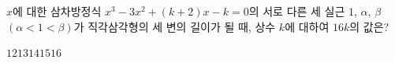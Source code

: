 $x$에 대한 삼차방정식 $x^3-3x^2+(k+2)x-k=0$의 서로 다른 세 실근 $1$, $\alpha$, $\beta$ $(\alpha<1<\beta)$가 직각삼각형의 세 변의 길이가 될 때, 상수 $k$에 대하여 $16k$의 값은?
\begin{choices32}{$12$}{$13$}{$14$}{$15$}{$16$}\end{choices32}
